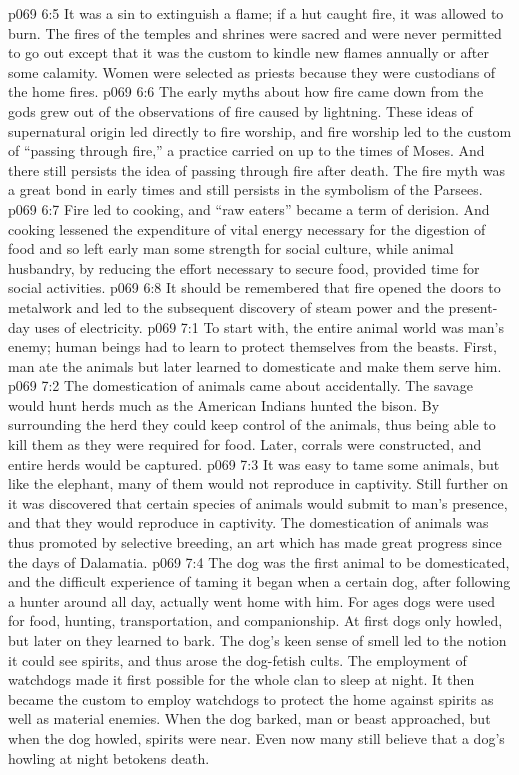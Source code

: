 \vs p069 6:5 It was a sin to extinguish a flame; if a hut caught fire, it was allowed to burn. The fires of the temples and shrines were sacred and were never permitted to go out except that it was the custom to kindle new flames annually or after some calamity. Women were selected as priests because they were custodians of the home fires.
\vs p069 6:6 The early myths about how fire came down from the gods grew out of the observations of fire caused by lightning. These ideas of supernatural origin led directly to fire worship, and fire worship led to the custom of “passing through fire,” a practice carried on up to the times of Moses. And there still persists the idea of passing through fire after death. The fire myth was a great bond in early times and still persists in the symbolism of the Parsees.
\vs p069 6:7 \pc Fire led to cooking, and “raw eaters” became a term of derision. And cooking lessened the expenditure of vital energy necessary for the digestion of food and so left early man some strength for social culture, while animal husbandry, by reducing the effort necessary to secure food, provided time for social activities.
\vs p069 6:8 It should be remembered that fire opened the doors to metalwork and led to the subsequent discovery of steam power and the present\hyp{}day uses of electricity.
\vs p069 7:1 To start with, the entire animal world was man’s enemy; human beings had to learn to protect themselves from the beasts. First, man ate the animals but later learned to domesticate and make them serve him.
\vs p069 7:2 The domestication of animals came about accidentally. The savage would hunt herds much as the American Indians hunted the bison. By surrounding the herd they could keep control of the animals, thus being able to kill them as they were required for food. Later, corrals were constructed, and entire herds would be captured.
\vs p069 7:3 It was easy to tame some animals, but like the elephant, many of them would not reproduce in captivity. Still further on it was discovered that certain species of animals would submit to man’s presence, and that they would reproduce in captivity. The domestication of animals was thus promoted by selective breeding, an art which has made great progress since the days of Dalamatia.
\vs p069 7:4 The dog was the first animal to be domesticated, and the difficult experience of taming it began when a certain dog, after following a hunter around all day, actually went home with him. For ages dogs were used for food, hunting, transportation, and companionship. At first dogs only howled, but later on they learned to bark. The dog’s keen sense of smell led to the notion it could see spirits, and thus arose the dog\hyp{}fetish cults. The employment of watchdogs made it first possible for the whole clan to sleep at night. It then became the custom to employ watchdogs to protect the home against spirits as well as material enemies. When the dog barked, man or beast approached, but when the dog howled, spirits were near. Even now many still believe that a dog’s howling at night betokens death.
